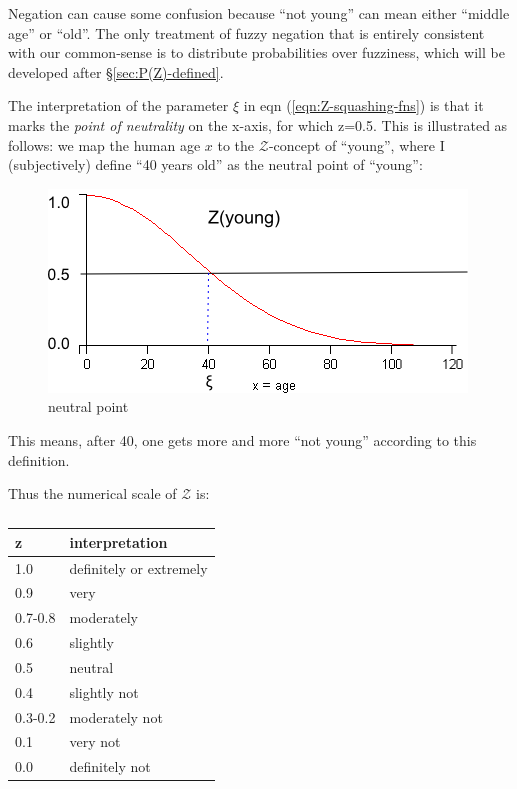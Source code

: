 Negation can cause some confusion because ``not young'' can mean either ``middle age'' or ``old''.  The only treatment of fuzzy negation that is entirely consistent with our common-sense is to distribute probabilities over fuzziness,  which will be developed after \S\ref{sec:P(Z)-defined}.

The interpretation of the parameter $\xi$ in eqn (\ref{eqn:Z-squashing-fns}) is that it marks the \textit{point of neutrality} on the x-axis, for which z=0.5.  This is illustrated as follows:  we map the human age $x$ to the $\mathcal{Z}$-concept of ``young'', where I (subjectively) define ``40 years old'' as the neutral point of ``young'':
\begin{figure}[H]
\centering
\includegraphics{neutral-point.png}
\caption{neutral point}
\end{figure}
This means, after 40, one gets more and more ``not young'' according to this definition.  

Thus the numerical scale of $\mathcal{Z}$ is:\\
\begin{table}[H]
\parbox{3cm}{\caption{}}
\begin{tabular}{|l||l|}
\hline
{\bfseries z} & {\bfseries interpretation}\\ \hline
1.0     & definitely or extremely\\
0.9     & very\\
0.7-0.8 & moderately\\
0.6     & slightly\\ \hline
0.5     & neutral\\ \hline
0.4     & slightly not\\
0.3-0.2 & moderately not\\
0.1     & very not\\
0.0     & definitely not\\ \hline
\end{tabular}
\end{table}


